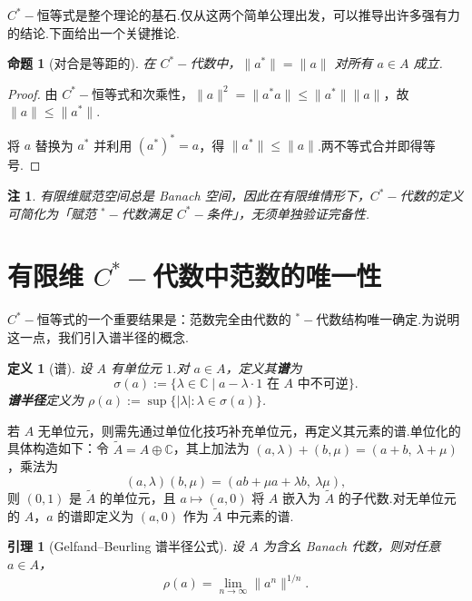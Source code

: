 \documentclass[math-font=lm, text-font=lm, math-style=TeX]{sjtureport}
\newtheorem{lemma}[theorem]{引理}
\newtheorem{proposition}[theorem]{命题}
\newtheorem{definition}{定义}[chapter]
\newtheorem{remark}{注}[chapter]
\theoremstyle{plain}
\newtheorem*{proof}{证明}
\theoremstyle{plain}
\begin{document}
$C^*-\!$恒等式是整个理论的基石.仅从这两个简单公理出发，可以推导出许多强有力的结论.下面给出一个关键推论.

\begin{proposition}[对合是等距的]\label{prop:isometry}
    在 $C^*-\!$代数中，$\|a^*\| = \|a\|$ 对所有 $a \in A$ 成立.
\end{proposition}

\begin{proof}
    由 $C^*-\!$恒等式和次乘性，$\|a\|^2 = \|a^*a\| \leq \|a^*\|\|a\|$，故 $\|a\| \leq \|a^*\|$.\par
    将 $a$ 替换为 $a^*$ 并利用 $(a^*)^* = a$，得 $\|a^*\| \leq \|a\|$.两不等式合并即得等号.
\end{proof}

\begin{remark}
    有限维赋范空间总是 Banach 空间，因此在有限维情形下，$C^*-\!$代数的定义可简化为「赋范 ${}^*-\!$代数满足 $C^*-\!$条件」，无须单独验证完备性.
\end{remark}

\section{有限维 $C^*-\!$代数中范数的唯一性}

$C^*-\!$恒等式的一个重要结果是：范数完全由代数的 ${}^*-\!$代数结构唯一确定.为说明这一点，我们引入谱半径的概念.

\begin{definition}[谱]
设 $A$ 有单位元 $1$.对 $a \in A$，定义其\textbf{谱}为
\begin{equation}
    \sigma(a) := \{\lambda \in \mathbb{C} \mid a - \lambda \cdot 1 \text{ 在 } A \text{ 中不可逆}\}.
\end{equation}
\textbf{谱半径}定义为 $\rho(a) := \sup\{|\lambda| : \lambda \in \sigma(a)\}$.
\end{definition}

若 $A$ 无单位元，则需先通过单位化技巧补充单位元，再定义其元素的谱.单位化的具体构造如下：令 $\tilde{A} = A \oplus \mathbb{C}$，其上加法为 $(a,\lambda) + (b,\mu) = (a+b,\ \lambda+\mu)$，乘法为
\begin{equation}
    (a,\lambda)(b,\mu) = (ab + \mu a + \lambda b,\ \lambda\mu),
\end{equation}
则 $(0,1)$ 是 $\tilde{A}$ 的单位元，且 $a \mapsto (a,0)$ 将 $A$ 嵌入为 $\tilde{A}$ 的子代数.对无单位元的 $A$，$a$ 的谱即定义为 $(a,0)$ 作为 $\tilde{A}$ 中元素的谱.

\begin{lemma}[Gelfand--Beurling 谱半径公式]\label{lem:spectral-radius-formula}
    设 $A$ 为含幺 Banach 代数，则对任意 $a \in A$，
    \begin{equation}\label{eq:gelfand-beurling}
        \rho(a) = \lim_{n \to \infty} \|a^n\|^{1/n}.
    \end{equation}
\end{lemma}
\end{document}
